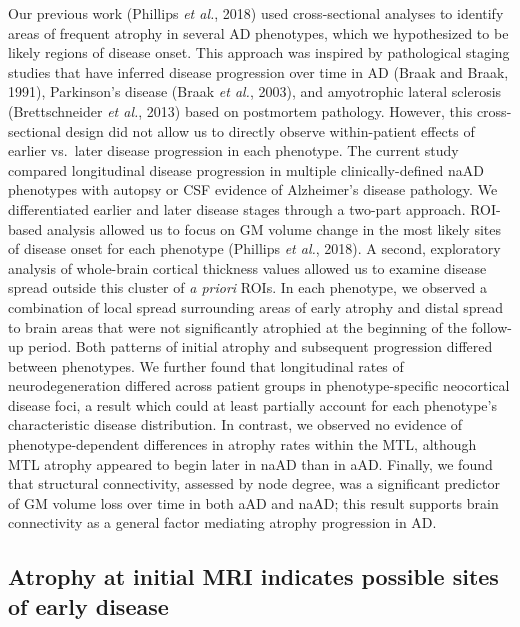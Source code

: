 \documentclass[]{article}
\begin{document}
Our previous work (Phillips \emph{et al.}, 2018) used cross-sectional
analyses to identify areas of frequent atrophy in several AD phenotypes,
which we hypothesized to be likely regions of disease onset. This
approach was inspired by pathological staging studies that have inferred
disease progression over time in AD (Braak and Braak, 1991), Parkinson's
disease (Braak \emph{et al.}, 2003), and amyotrophic lateral sclerosis
(Brettschneider \emph{et al.}, 2013) based on postmortem pathology.
However, this cross-sectional design did not allow us to directly
observe within-patient effects of earlier vs.~later disease progression
in each phenotype. The current study compared longitudinal disease
progression in multiple clinically-defined naAD phenotypes with autopsy
or CSF evidence of Alzheimer's disease pathology. We differentiated
earlier and later disease stages through a two-part approach. ROI-based
analysis allowed us to focus on GM volume change in the most likely
sites of disease onset for each phenotype (Phillips \emph{et al.},
2018). A second, exploratory analysis of whole-brain cortical thickness
values allowed us to examine disease spread outside this cluster of
\emph{a priori} ROIs. In each phenotype, we observed a combination of
local spread surrounding areas of early atrophy and distal spread to
brain areas that were not significantly atrophied at the beginning of
the follow-up period. Both patterns of initial atrophy and subsequent
progression differed between phenotypes. We further found that
longitudinal rates of neurodegeneration differed across patient groups
in phenotype-specific neocortical disease foci, a result which could at
least partially account for each phenotype's characteristic disease
distribution. In contrast, we observed no evidence of
phenotype-dependent differences in atrophy rates within the MTL,
although MTL atrophy appeared to begin later in naAD than in aAD.
Finally, we found that structural connectivity, assessed by node degree,
was a significant predictor of GM volume loss over time in both aAD and
naAD; this result supports brain connectivity as a general factor
mediating atrophy progression in AD.

\subsection*{Atrophy at initial MRI indicates possible sites of early
disease}\label{atrophy-at-initial-mri-indicates-possible-sites-of-early-disease}
\end{document}

